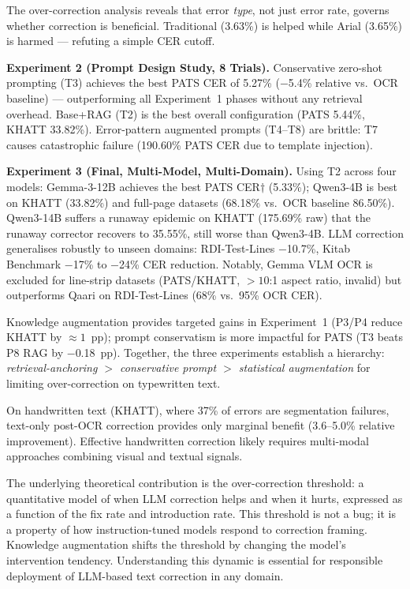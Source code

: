 The over-correction analysis reveals that error \emph{type}, not just error
rate, governs whether correction is beneficial. Traditional (3.63\%) is
helped while Arial (3.65\%) is harmed --- refuting a simple CER cutoff.

\textbf{Experiment 2 (Prompt Design Study, 8 Trials).}
Conservative zero-shot prompting (T3) achieves the best PATS CER of 5.27\%
($-$5.4\% relative vs.\ OCR baseline) --- outperforming all Experiment~1
phases without any retrieval overhead. Base+RAG (T2) is the best overall
configuration (PATS 5.44\%, KHATT 33.82\%). Error-pattern augmented prompts
(T4--T8) are brittle: T7 causes catastrophic failure (190.60\% PATS CER
due to template injection).

\textbf{Experiment 3 (Final, Multi-Model, Multi-Domain).}
Using T2 across four models: Gemma-3-12B achieves the best PATS CER$\dagger$
(5.33\%); Qwen3-4B is best on KHATT (33.82\%) and full-page datasets
(68.18\% vs.\ OCR baseline 86.50\%). Qwen3-14B suffers a runaway epidemic
on KHATT (175.69\% raw) that the runaway corrector recovers to 35.55\%,
still worse than Qwen3-4B. LLM correction generalises robustly to unseen
domains: RDI-Test-Lines $-$10.7\%, Kitab Benchmark $-$17\% to $-$24\%
CER reduction. Notably, Gemma VLM OCR is excluded for line-strip datasets
(PATS/KHATT, $>10$:1 aspect ratio, invalid) but outperforms Qaari on
RDI-Test-Lines (68\% vs.\ 95\% OCR CER).

Knowledge augmentation provides targeted gains in Experiment~1 (P3/P4 reduce
KHATT by $\approx 1$~pp); prompt conservatism is more impactful for PATS
(T3 beats P8 RAG by $-$0.18~pp). Together, the three experiments establish
a hierarchy: \emph{retrieval-anchoring $>$ conservative prompt $>$ statistical
augmentation} for limiting over-correction on typewritten text.

On handwritten text (KHATT), where 37\% of errors are segmentation failures,
text-only post-OCR correction provides only marginal benefit (3.6--5.0\%
relative improvement). Effective handwritten correction likely requires
multi-modal approaches combining visual and textual signals.

The underlying theoretical contribution is the over-correction threshold: a
quantitative model of when LLM correction helps and when it hurts, expressed
as a function of the fix rate and introduction rate. This threshold is not
a bug; it is a property of how instruction-tuned models respond to correction
framing. Knowledge augmentation shifts the threshold by changing the model's
intervention tendency. Understanding this dynamic is essential for responsible
deployment of LLM-based text correction in any domain.

